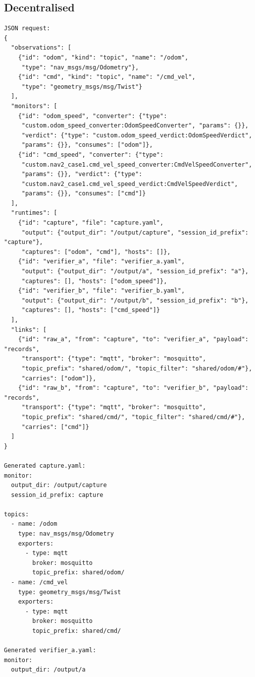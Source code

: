 \documentclass[11pt]{article}
\begin{document}
\subsection{Decentralised}

\begin{verbatim}
JSON request:
{
  "observations": [
    {"id": "odom", "kind": "topic", "name": "/odom",
     "type": "nav_msgs/msg/Odometry"},
    {"id": "cmd", "kind": "topic", "name": "/cmd_vel",
     "type": "geometry_msgs/msg/Twist"}
  ],
  "monitors": [
    {"id": "odom_speed", "converter": {"type":
     "custom.odom_speed_converter:OdomSpeedConverter", "params": {}},
     "verdict": {"type": "custom.odom_speed_verdict:OdomSpeedVerdict",
     "params": {}}, "consumes": ["odom"]},
    {"id": "cmd_speed", "converter": {"type":
     "custom.nav2_case1.cmd_vel_speed_converter:CmdVelSpeedConverter",
     "params": {}}, "verdict": {"type":
     "custom.nav2_case1.cmd_vel_speed_verdict:CmdVelSpeedVerdict",
     "params": {}}, "consumes": ["cmd"]}
  ],
  "runtimes": [
    {"id": "capture", "file": "capture.yaml",
     "output": {"output_dir": "/output/capture", "session_id_prefix": "capture"},
     "captures": ["odom", "cmd"], "hosts": []},
    {"id": "verifier_a", "file": "verifier_a.yaml",
     "output": {"output_dir": "/output/a", "session_id_prefix": "a"},
     "captures": [], "hosts": ["odom_speed"]},
    {"id": "verifier_b", "file": "verifier_b.yaml",
     "output": {"output_dir": "/output/b", "session_id_prefix": "b"},
     "captures": [], "hosts": ["cmd_speed"]}
  ],
  "links": [
    {"id": "raw_a", "from": "capture", "to": "verifier_a", "payload": "records",
     "transport": {"type": "mqtt", "broker": "mosquitto",
     "topic_prefix": "shared/odom/", "topic_filter": "shared/odom/#"},
     "carries": ["odom"]},
    {"id": "raw_b", "from": "capture", "to": "verifier_b", "payload": "records",
     "transport": {"type": "mqtt", "broker": "mosquitto",
     "topic_prefix": "shared/cmd/", "topic_filter": "shared/cmd/#"},
     "carries": ["cmd"]}
  ]
}

Generated capture.yaml:
monitor:
  output_dir: /output/capture
  session_id_prefix: capture

topics:
  - name: /odom
    type: nav_msgs/msg/Odometry
    exporters:
      - type: mqtt
        broker: mosquitto
        topic_prefix: shared/odom/
  - name: /cmd_vel
    type: geometry_msgs/msg/Twist
    exporters:
      - type: mqtt
        broker: mosquitto
        topic_prefix: shared/cmd/

Generated verifier_a.yaml:
monitor:
  output_dir: /output/a


\end{verbatim}
\end{document}
